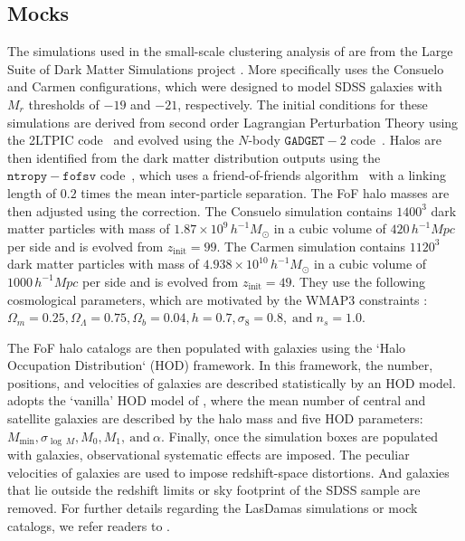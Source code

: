 \documentclass[12pt, letterpaper, preprint]{aastex}
\begin{document}
\subsection{\cite{sinha2017a} Mocks} \label{sec:gmf} 
The simulations used in the small-scale clustering analysis of \cite{sinha2017a} 
are from the Large Suite of Dark Matter Simulations project 
\citep[LasDamas;][]{mcbride2009}. More specifically \cite{sinha2017a} uses
the Consuelo and Carmen configurations, which were designed to model SDSS 
galaxies with $M_r$ thresholds of $-19$ and $-21$, respectively.
The initial conditions for these simulations are derived from second order 
Lagrangian Perturbation Theory using the 2LTPIC code~\citep{scoccimarro1998, crocce2006}
and evolved using the $N$-body $\mathtt{GADGET}-2$ code~\citep{springel2005}.
Halos are then identified from the dark matter distribution outputs using 
the $\mathtt{ntropy-fofsv}$ code~\citep{gardner2007}, which uses a 
friend-of-friends algorithm~\citep[FoF;][]{davis1985} with a linking length of $0.2$
times the mean inter-particle separation. The FoF halo masses are then adjusted 
using the \cite{warren2006} correction. 
The Consuelo simulation contains $1400^3$ dark matter particles with 
mass of $1.87 \times 10^9\,h^{-1} M_\odot$ in a cubic volume of 
$420\,h^{-1} Mpc$ per side and is evolved from $z_\mathrm{init} = 99$. 
The Carmen simulation contains $1120^3$ dark matter particles with mass 
of $4.938 \times 10^{10}\,h^{-1} M_\odot$ in a cubic volume of 
$1000\,h^{-1} Mpc$ per side and is evolved from $z_\mathrm{init} = 49$. 
They use the following cosmological parameters, which are motivated 
by the WMAP3 constraints \citep{spergel2007}:
$\Omega_m = 0.25, \Omega_\Lambda = 0.75, \Omega_b = 0.04, h = 0.7, \sigma_8 = 0.8,\;\mathrm{and}\;n_s = 1.0.$

The FoF halo catalogs are then populated with galaxies using the 
`Halo Occupation Distribution` (HOD) framework. In this framework, the 
number, positions, and velocities of galaxies are described statistically 
by an HOD model. \cite{sinha2017a} adopts the `vanilla' HOD model of \cite{zheng2007}, 
where the mean number of central and satellite galaxies are described by 
the halo mass and five HOD parameters: $M_\mathrm{min}, 
\sigma_{\log\,M} , M_0, M_1,~\mathrm{and}~\alpha$. Finally, once the 
simulation boxes are populated with galaxies, observational systematic 
effects are imposed. The peculiar velocities of galaxies are used to 
impose redshift-space distortions. And galaxies that lie outside the redshift
limits or sky footprint of the SDSS sample are removed. For further 
details regarding the LasDamas simulations or mock catalogs, we refer
readers to \cite{sinha2017a}.
\end{document}
